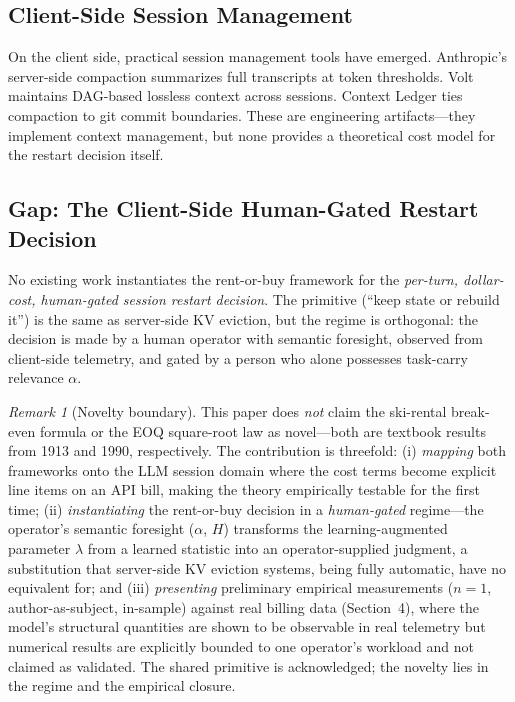 \documentclass[11pt]{article}
\theoremstyle{definition}
\theoremstyle{remark}
\newtheorem{remark}[theorem]{Remark}
\begin{document}
\subsection{Client-Side Session Management}

On the client side, practical session management tools have emerged. Anthropic's server-side compaction summarizes full transcripts at token thresholds. Volt \citep{volt2025} maintains DAG-based lossless context across sessions. Context Ledger \citep{contextledger2025} ties compaction to git commit boundaries. These are engineering artifacts---they implement context management, but none provides a theoretical cost model for the restart decision itself.

\subsection{Gap: The Client-Side Human-Gated Restart Decision}

No existing work instantiates the rent-or-buy framework for the \emph{per-turn, dollar-cost, human-gated session restart decision}. The primitive (``keep state or rebuild it'') is the same as server-side KV eviction, but the regime is orthogonal: the decision is made by a human operator with semantic foresight, observed from client-side telemetry, and gated by a person who alone possesses task-carry relevance $\alpha$.

\begin{remark}[Novelty boundary]
This paper does \emph{not} claim the ski-rental break-even formula or the EOQ square-root law as novel---both are textbook results from 1913 and 1990, respectively. The contribution is threefold: (i) \emph{mapping} both frameworks onto the LLM session domain where the cost terms become explicit line items on an API bill, making the theory empirically testable for the first time; (ii) \emph{instantiating} the rent-or-buy decision in a \emph{human-gated} regime---the operator's semantic foresight ($\alpha$, $H$) transforms the learning-augmented parameter $\lambda$ from a learned statistic into an operator-supplied judgment, a substitution that server-side KV eviction systems, being fully automatic, have no equivalent for; and (iii) \emph{presenting} preliminary empirical measurements ($n=1$, author-as-subject, in-sample) against real billing data (Section~4), where the model's structural quantities are shown to be observable in real telemetry but numerical results are explicitly bounded to one operator's workload and not claimed as validated. The shared primitive is acknowledged; the novelty lies in the regime and the empirical closure.
\end{remark}
\end{document}
